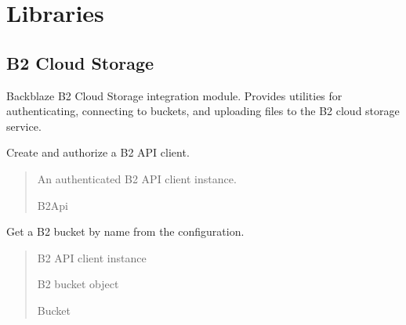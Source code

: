 \documentclass[letterpaper,10pt,openany,oneside,english]{sphinxmanual}
\begin{document}
\sphinxstepscope


\chapter{Libraries}
\label{\detokenize{modules/libs:libraries}}\label{\detokenize{modules/libs::doc}}

\section{B2 Cloud Storage}
\label{\detokenize{modules/libs:b2-cloud-storage}}
\sphinxAtStartPar
Backblaze B2 Cloud Storage integration module.
Provides utilities for authenticating, connecting to buckets, and uploading files
to the B2 cloud storage service.


\begin{savenotes}\begin{fulllineitems}

\pysigstartsignatures
{}
\pysigstopsignatures
\sphinxAtStartPar
Create and authorize a B2 API client.
\begin{quote}\begin{description}
\sphinxAtStartPar
An authenticated B2 API client instance.

\sphinxAtStartPar
B2Api

\end{description}\end{quote}

\end{fulllineitems}\end{savenotes}



\begin{savenotes}\begin{fulllineitems}

\pysigstartsignatures
{}
\pysigstopsignatures
\sphinxAtStartPar
Get a B2 bucket by name from the configuration.
\begin{quote}\begin{description}
\sphinxAtStartPar
{} \textendash{} B2 API client instance

\sphinxAtStartPar
B2 bucket object

\sphinxAtStartPar
Bucket

\end{description}\end{quote}

\end{fulllineitems}\end{savenotes}
\end{document}

